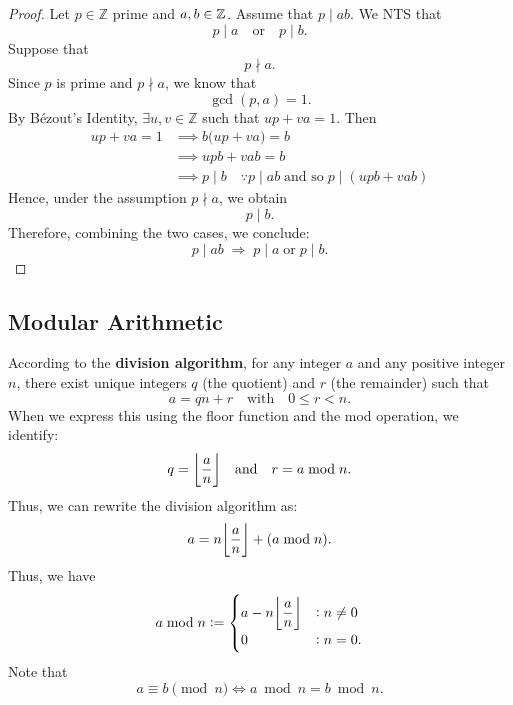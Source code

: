 \documentclass[11pt,openany]{article}
\begin{document}
\newpage
{}
\begin{proof}
Let $p\in\mathbb{Z}$ prime and $a,b\in\mathbb{Z}$. Assume that $p\mid ab$. We NTS that \[
p\mid a \quad \text{or} \quad p\mid b.
\] Suppose that \[
p\nmid a.
\]
Since \( p \) is prime and \( p \nmid a \), we know that \[
\gcd(p,a) = 1.
\]
By Bézout's Identity, \( \exists u,v\in\mathbb{Z} \) such that $
up + va = 1$. Then \begin{align*}
	u p + va = 1 &\implies b\bigl(up + va\bigr) = b\\
	&\implies upb+vab=b\\
	&\implies p\mid b\quad\because p\mid ab\; \text{and so}\; p\mid (upb+vab)
\end{align*}
Hence, under the assumption \( p\nmid a \), we obtain \[
p\mid b.
\] Therefore, combining the two cases, we conclude:
\[
p\mid ab \;\Longrightarrow\; p\mid a\;\text{or}\;p\mid b.
\]
\end{proof}
\newpage
\subsection{Modular Arithmetic}
\begin{remark*}
According to the \textbf{division algorithm}, for any integer 
$a$ and any positive integer $n$, there exist unique integers 
$q$ (the quotient) and $r$ (the remainder) such that \[
a=qn+r\quad\text{with}\quad 0\leq r< n.
\] When we express this using the floor function and the mod operation, we identify: \[
q=\floor*{\frac{a}{n}}\quad\text{and}\quad r= a\bmod n.
\] Thus,  we can rewrite the division algorithm as: \[
a=n\floor*{\frac{a}{n}}+(a\bmod n).
\] Thus, we have \[
a\bmod n:=\begin{cases}
	\displaystyle a-n\floor*{\frac{a}{n}} &: n\neq 0\\
	\displaystyle 0 &: n= 0.
\end{cases}
\] Note that \[
a\equiv b\pmod{n}\iff a\bmod n=b\bmod n.
\]
\end{remark*}
\end{document}
